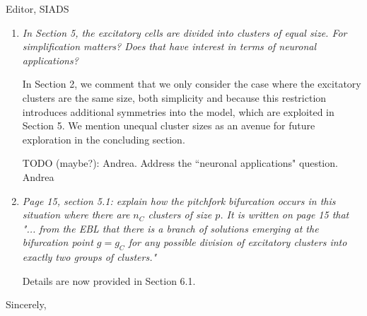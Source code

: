 \documentclass[11pt]{letter}
\begin{document}
\begin{letter}{Editor, SIADS}
\begin{enumerate}
\item \emph{In Section 5, the excitatory cells are divided into clusters of equal size. For simplification matters? Does that have interest in terms of neuronal applications? } 

\vspace{4mm} 
In Section 2, we comment that we only consider the case where the excitatory clusters are the same size, both simplicity and because this restriction introduces additional symmetries into the model, which are exploited in Section 5. We mention unequal cluster sizes as an avenue for future exploration in the concluding section.

\vspace{4mm} 
TODO (maybe?): Andrea. Address the ``neuronal applications" question. Andrea


\item \emph{Page 15, section 5.1: explain how the pitchfork bifurcation occurs in this situation where there are $n_C$ clusters of size $p$. It is written on page 15 that "... from the EBL that there is a branch of solutions emerging at the bifurcation point $g = g_C$ for any possible division of excitatory clusters into exactly two groups of clusters." }
\vspace{4mm} 

Details are now provided in Section 6.1.


\end{enumerate}


\closing{Sincerely,}

\end{letter}
\end{document}
